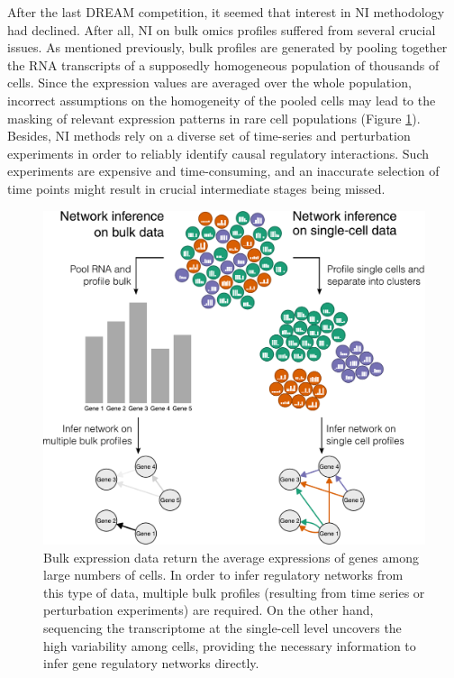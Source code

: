 After the last DREAM competition, it seemed that interest in NI methodology had declined. After all, NI on bulk omics profiles suffered from several crucial issues. As mentioned previously, bulk profiles are generated by pooling together the RNA transcripts of a supposedly homogeneous population of thousands of cells. Since the expression values are averaged over the whole population, incorrect assumptions on the homogeneity of the pooled cells may lead to the masking of relevant expression patterns in rare cell populations (Figure \ref{fig:bulk_vs_singlecell}). Besides, NI methods rely on a diverse set of time-series and perturbation experiments in order to reliably identify causal regulatory interactions. Such experiments are expensive and time-consuming, and an inaccurate selection of time points might result in crucial intermediate stages being missed.

\begin{figure}[htb!]
	\centering
	\includegraphics[width=\Largefigure]{fig/ni_bulk_vs_sc}
	\caption{Bulk expression data return the average expressions of genes among large numbers of cells. In order to infer regulatory networks from this type of data, multiple bulk profiles (resulting from time series or perturbation experiments) are required. On the other hand, sequencing the transcriptome at the single-cell level uncovers the high variability among cells, providing the necessary information to infer gene regulatory networks directly.} %
	\label{fig:bulk_vs_singlecell}
\end{figure}

